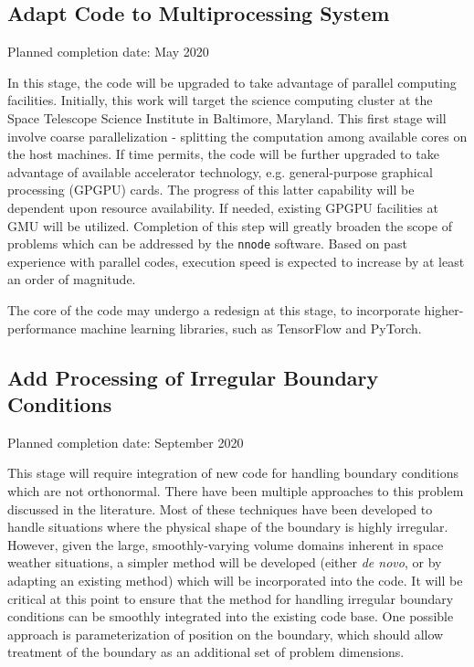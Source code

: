 \documentclass{article}
\begin{document}
\subsection{Adapt Code to Multiprocessing System}

Planned completion date: May 2020

In this stage, the code will be upgraded to take advantage of parallel computing facilities. Initially, this work will target the science computing cluster at the Space Telescope Science Institute in Baltimore, Maryland. This first stage will involve coarse parallelization - splitting the computation among available cores on the host machines. If time permits, the code will be further upgraded to take advantage of available accelerator technology, e.g. general-purpose graphical processing (GPGPU) cards. The progress of this latter capability will be dependent upon resource availability. If needed, existing GPGPU facilities at GMU will be utilized. Completion of this step will greatly broaden the scope of problems which can be addressed by the \texttt{nnode} software. Based on past experience with parallel codes, execution speed is expected to increase by at least an order of magnitude.

The core of the code may undergo a redesign at this stage, to incorporate higher-performance machine learning libraries, such as TensorFlow and PyTorch.

\subsection{Add Processing of Irregular Boundary Conditions}

Planned completion date: September 2020

This stage will require integration of new code for handling boundary conditions which are not orthonormal. There have been multiple approaches to this problem discussed in the literature. Most of these techniques have been developed to handle situations where the physical shape of the boundary is highly irregular. However, given the large, smoothly-varying volume domains inherent in space weather situations, a simpler method will be developed (either \emph{de novo}, or by adapting an existing method) which will be incorporated into the code. It will be critical at this point to ensure that the method for handling irregular boundary conditions can be smoothly integrated into the existing code base. One possible approach is parameterization of position on the boundary, which should allow treatment of the boundary as an additional set of problem dimensions.
\end{document}
